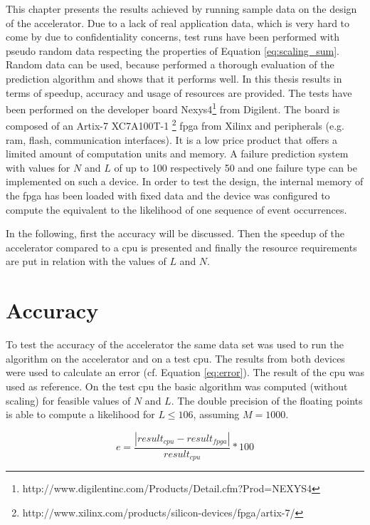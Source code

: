 \documentclass[mscthesis]{usiinfthesis}
\begin{document}
This chapter presents the results achieved by running sample data on the design
of the accelerator. Due to a lack of real application data, which is very hard
to come by due to confidentiality concerns, test runs have been performed with
pseudo random data respecting the properties of Equation \ref{eq:scaling_sum}.
Random data can be used, because \cite{salfner08} performed a thorough evaluation
of the prediction algorithm and shows that it performs well. In this thesis results in
terms of speedup, accuracy and usage of resources are provided. The tests
have been performed on the developer board
Nexys4\footnote{http://www.digilentinc.com/Products/Detail.cfm?Prod=NEXYS4}
from Digilent. The board is composed of an Artix-7 XC7A100T-1
\footnote{http://www.xilinx.com/products/silicon-devices/fpga/artix-7/}
\gls{fpga} from Xilinx and peripherals (e.g. \gls{ram}, flash,
communication interfaces). It is a low price product that offers a limited
amount of computation units and memory. A failure prediction system with values
for $N$ and $L$ of up to 100 respectively 50 and one failure type can be
implemented on such a device. In order to test the design, the internal memory
of the \gls{fpga} has been loaded with fixed data and the device was configured
to compute the equivalent to the likelihood of one sequence of event
occurrences.

In the following, first the accuracy will be discussed. Then the speedup of the
accelerator compared to a \gls{cpu} is presented and finally the resource
requirements are put in relation with the values of $L$ and $N$.

\section{Accuracy}

To test the accuracy of the accelerator the same data set was used to run the
algorithm on the accelerator and on a test \gls{cpu}. The results from both
devices were used to calculate an error (cf. Equation \ref{eq:error}). The
result of the \gls{cpu} was used as reference. On the test \gls{cpu} the basic
algorithm was computed (without scaling) for feasible values of $N$ and $L$.
The double precision of the floating points is able to compute a likelihood for
$L \leq 106$, assuming $M=1000$.

\begin{equation}
    \label{eq:error}
    e = \frac{|result_{cpu}-result_{fpga}|}{result_{cpu}}*100
\end{equation}
\end{document}
